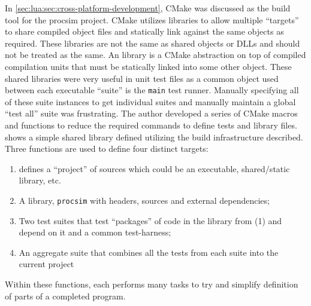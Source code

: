 In \cref{sec:lua:sec:cross-platform-development}, CMake was discussed as the build tool for the procsim project. CMake utilizes  libraries to allow multiple ``targets'' to share compiled object files and statically link against the same objects as required. These  libraries are not the same as shared objects or DLLs and should not be treated as the same. An  library is a CMake abstraction on top of compiled compilation units that must be statically linked into some other object. These shared  libraries were very useful in unit test files as a common object used between each executable ``suite'' is the \verb|main| test runner. Manually specifying all of these suite instances to get individual suites and manually maintain a global ``test all'' suite was frustrating. The author developed a series of CMake macros \cite{CMake:macro} and functions \cite{CMake:function} to reduce the required commands to define tests and library files.  shows a simple shared library defined utilizing the build infrastructure described. Three functions are used to define four distinct targets: 
\begin{enumerate}
    \item {} defines a ``project'' of sources which could be an executable, shared/static library, etc.
    \item A library, \verb|procsim| with headers, sources and external dependencies;
    \item Two test suites that test ``packages'' of code in the library from (1) and depend on it and a common test-harness;
    \item An aggregate  suite that combines all the tests from each suite into the current project
\end{enumerate}
Within these functions, each performs many tasks to try and simplify definition of parts of a completed program.

